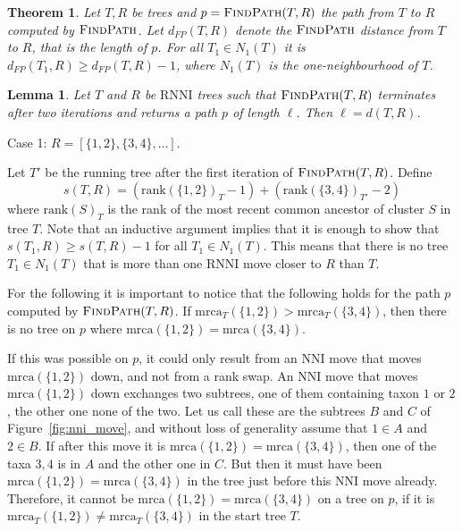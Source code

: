 \documentclass{amsart}
\newtheorem{lemma}{Lemma}
\newtheorem{theorem}{Theorem}
\newcommand{\rnni}{\mathrm{RNNI}}
\newcommand{\findpath}{\textsc{FindPath}}
\newcommand{\mrca}{\mathrm{mrca}}
\newcommand{\rank}{\mathrm{rank}}
\newcommand{\nni}{\mathrm{NNI}}
\begin{document}
\endproof

\begin{theorem}
    Let $T,R$ be trees and $p = \findpath(T,R)$ the path from $T$ to $R$ computed by $\findpath$.
    Let $d_{FP}(T,R)$ denote the $\findpath$ distance from $T$ to $R$, that is the length of $p$.
    For all $T_1 \in N_1(T)$ it is $d_{FP}(T_1,R) \geq d_{FP}(T,R) - 1$, where $N_1(T)$ is the one-neighbourhood of $T$.
\end{theorem}

\proof

\endproof

\begin{lemma}
Let $T$ and $R$ be $\rnni$ trees such that $\findpath(T, R)$ terminates after two iterations and returns a path $p$ of length $\ell$.
Then $\ell = d(T, R)$.
\end{lemma}

\proof
Case 1: $R = [\{1, 2\}, \{3, 4\}, \ldots]$.

Let $T'$ be the running tree after the first iteration of $\findpath(T, R)$.
Define
\[
s(T, R) = (\rank(\{1,2\})_T - 1) + (\rank(\{3,4\})_{T'} - 2)
\]
where $\rank(S)_T$ is the rank of the most recent common ancestor of cluster $S$ in tree $T$.
Note that an inductive argument implies that it is enough to show that $s(T_1, R) \geq s(T, R) - 1$ for all $T_1 \in N_1(T)$.
This means that there is no tree $T_1 \in N_1(T)$ that is more than one $\rnni$ move closer to $R$ than $T$.

For the following it is important to notice that the following holds for the path $p$ computed by $\findpath(T,R)$.
If $\mrca_T(\{1,2\}) > \mrca_T(\{3,4\})$, then there is no tree on $p$ where $\mrca(\{1,2\}) = \mrca(\{3,4\})$.

If this was possible on $p$, it could only result from an $\nni$ move that moves $\mrca(\{1,2\})$ down, and not from a rank swap.
An $\nni$ move that moves $\mrca(\{1,2\})$ down exchanges two subtrees, one of them containing taxon $1$ or $2$, the other one none of the two.
Let us call these are the subtrees $B$ and $C$ of Figure~\ref{fig:nni_move}, and without loss of generality assume that $1 \in A$ and $2 \in B$.
If after this move it is $\mrca(\{1,2\}) = \mrca(\{3,4\})$, then one of the taxa $3,4$ is in $A$ and the other one in $C$.
But then it must have been $\mrca(\{1,2\}) = \mrca(\{3,4\})$ in the tree just before this $\nni$ move already.
Therefore, it cannot be $\mrca(\{1,2\}) = \mrca(\{3,4\})$ on a tree on $p$, if it is $\mrca_T(\{1,2\}) \neq \mrca_T(\{3,4\})$ in the start tree $T$.
\end{document}
